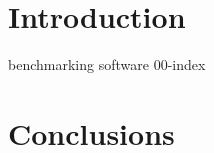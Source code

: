 \documentclass[11pt]{report}
\begin{document}

\makecover%


\clearpage
{}
\settableofcontents%
\tableofcontents


\clearpage
\setlistoffigures%
\listoffigures


\clearpage
\setlistoftables%
\listoftables





\chapter{Introduction}


{benchmarking}
{software}
{00-index}

\chapter{Conclusions}
\label{chap:conclusions}



\clearpage




\appendix






\makedisclaimer%
\end{document}
